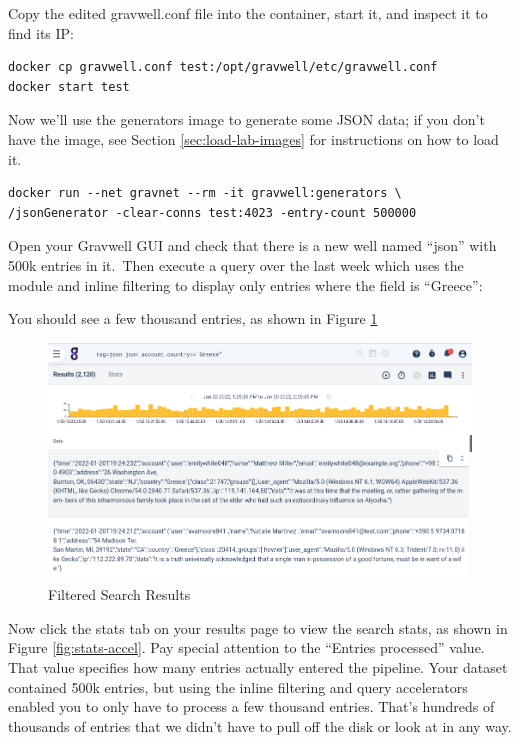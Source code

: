 {Copy the edited gravwell.conf file into the container, start it, and inspect it
to find its IP:

\begin{Verbatim}[breaklines=true]
docker cp gravwell.conf test:/opt/gravwell/etc/gravwell.conf
docker start test
\end{Verbatim}

Now we'll use the generators image to generate some JSON data; if you don't have the  image, see Section \ref{sec:load-lab-images} for instructions on how to load it.

\begin{Verbatim}[breaklines=true]
docker run --net gravnet --rm -it gravwell:generators \
/jsonGenerator -clear-conns test:4023 -entry-count 500000
\end{Verbatim}

Open your Gravwell GUI and check that there is a new well named
``json'' with 500k entries in it.~Then execute a query over the last
week which uses the \code{json} module and inline filtering to display only
entries where the \code{account.country} field is ``Greece'':


You should see a few thousand entries, as shown in Figure \ref{fig:greece}

\begin{figure}
	\includegraphics{images/greece-accel.png}
	\caption{Filtered Search Results}
	\label{fig:greece}
\end{figure}

Now click the stats tab on your results page to view the search stats, as shown in Figure \ref{fig:stats-accel}.
Pay special attention to the ``Entries processed'' value. That value
specifies how many entries actually entered the pipeline. Your dataset
contained 500k entries, but using the inline filtering and query
accelerators enabled you to only have to process a few thousand entries.
That's hundreds of thousands of entries that we didn't have to pull off
the disk or look at in any way.

}
